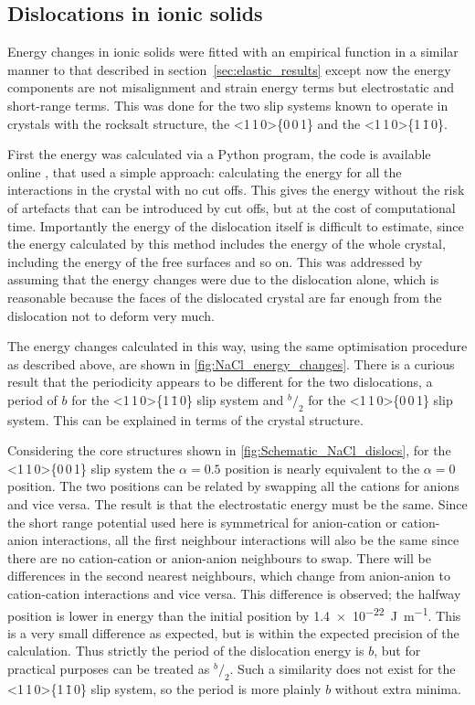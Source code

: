 \FloatBarrier
\subsection{Dislocations in ionic solids}
\FloatBarrier


Energy changes in ionic solids were fitted with an empirical function in a similar manner to that described in section~\ref{sec:elastic_results} except now the energy components are not misalignment and strain energy terms but electrostatic and short-range terms. This was done for the two slip systems known to operate in crystals with the rocksalt structure, the <1\,1\,0>\{0\,0\,1\} and the <1\,1\,0>\{1\,\={1}\,0\}.


First the energy was calculated via a Python program, the code is available online \cite{code}, that used a simple approach: calculating the energy for all the interactions in the crystal with no cut offs. This gives the energy without the risk of artefacts that can be introduced by cut offs, but at the cost of computational time. Importantly the energy of the dislocation itself is difficult to estimate, since the energy calculated by this method includes the energy of the whole crystal, including the energy of the free surfaces and so on. This was addressed by assuming that the energy changes were due to the dislocation alone, which is reasonable because the faces of the dislocated crystal are far enough from the dislocation not to deform very much.


The energy changes calculated in this way, using the same optimisation procedure as described above, are shown in \autoref{fig:NaCl_energy_changes}. There is a curious result that the periodicity appears to be different for the two dislocations, a period of $b$ for the <1\,1\,0>\{1\,\={1}\,0\} slip system and $^b\!/_2$ for the <1\,1\,0>\{0\,0\,1\} slip system. This can be explained in terms of the crystal structure. 

Considering the core structures shown in \autoref{fig:Schematic_NaCl_dislocs}, for the <1\,1\,0>\{0\,0\,1\} slip system the $\alpha=0.5$ position is nearly equivalent to the $\alpha=0$ position. The two positions can be related by swapping all the cations for anions and vice versa. The result is that the electrostatic energy must be the same. Since the short range potential used here is symmetrical for anion-cation or cation-anion interactions, all the first neighbour interactions will also be the same since there are no cation-cation or anion-anion neighbours to swap. There will be differences in the second nearest neighbours, which change from anion-anion to cation-cation interactions and vice versa. This difference is observed; the halfway position is lower in energy than the initial position by \SI{1.4e-22}{\joule\per\meter}. This is a very small difference as expected, but is within the expected precision of the calculation. Thus strictly the period of the dislocation energy is $b$, but for practical purposes can be treated as $^b\!/_2$. Such a similarity does not exist for the <1\,1\,0>\{1\,\={1}\,0\} slip system, so the period is more plainly $b$ without extra minima.





